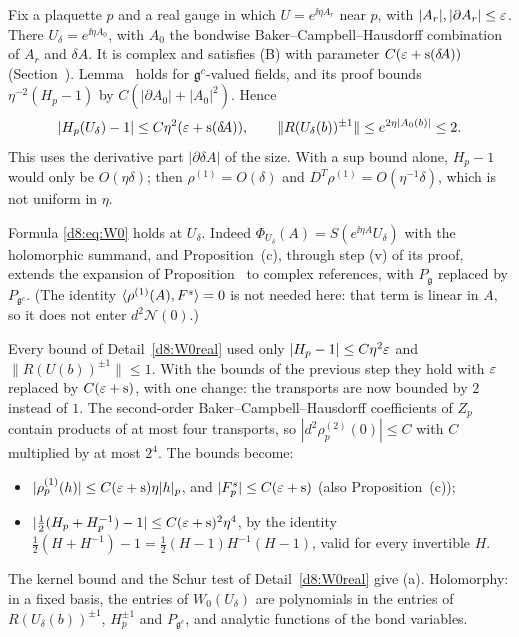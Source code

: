 \begin{detail}
\begin{step}
Fix a plaquette $p$ and a real gauge in which $U=e^{\ii\eta A_r}$ near $p$, with $|A_r|,|\partial A_r|\le\varepsilon$. There $U_\delta=e^{\ii\eta A_0}$, with $A_0$ the bondwise Baker--Campbell--Hausdorff combination of $A_r$ and $\delta\!A$. It is complex and satisfies (B) with parameter $C(\varepsilon+\mathrm s(\delta\!A))$ (Section~). Lemma~ holds for $\mathfrak g^c$-valued fields, and its proof bounds $\eta^{-2}(H_p-1)$ by $C(|\partial A_0|+|A_0|^2)$. Hence
\[
|H_p(U_\delta)-1|\le C\eta^2(\varepsilon+\mathrm s(\delta\!A)),\qquad\|R(U_\delta(b))^{\pm1}\|\le e^{2\eta|A_0(b)|}\le2 .
\]
This uses the derivative part $|\partial\delta\!A|$ of the size. With a sup bound alone, $H_p-1$ would only be $O(\eta\delta)$; then $\rho^{(1)}=O(\delta)$ and $D^T\rho^{(1)}=O(\eta^{-1}\delta)$, which is not uniform in $\eta$.
\end{step}

\begin{step}
Formula \eqref{d8:eq:W0} holds at $U_\delta$. Indeed $\Phi_{U_\delta}(A)=S(e^{\ii\eta A}U_\delta)$ with the holomorphic summand, and Proposition~(c), through step (v) of its proof, extends the expansion of Proposition~ to complex references, with $P_{\mathfrak g}$ replaced by $P_{\mathfrak g^c}$. (The identity $\langle \rho^{(1)}(A),F^s\rangle=0$ is not needed here: that term is linear in $A$, so it does not enter $d^2\mathcal N(0)$.)

Every bound of Detail~\ref{d8:W0real} used only $|H_p-1|\le C\eta^2\varepsilon$ and $\|R(U(b))^{\pm1}\|\le1$. With the bounds of the previous step they hold with $\varepsilon$ replaced by $C(\varepsilon+\mathrm s)$, with one change: the transports are now bounded by $2$ instead of $1$. The second-order Baker--Campbell--Hausdorff coefficients of $Z_p$ contain products of at most four transports, so $|d^2\rho^{(2)}_p(0)|\le C$ with $C$ multiplied by at most $2^4$. The bounds become:
\begin{itemize}
\item $|\rho^{(1)}_p(h)|\le C(\varepsilon+\mathrm s)\eta|h|_p$, and $|F^s_p|\le C(\varepsilon+\mathrm s)$ (also Proposition~(c));
\item $|\frac12(H_p+H_p^{-1})-1|\le C(\varepsilon+\mathrm s)^2\eta^4$, by the identity $\frac12(H+H^{-1})-1=\frac12(H-1)H^{-1}(H-1)$, valid for every invertible $H$.
\end{itemize}
The kernel bound and the Schur test of Detail~\ref{d8:W0real} give (a). Holomorphy: in a fixed basis, the entries of $W_0(U_\delta)$ are polynomials in the entries of $R(U_\delta(b))^{\pm1}$, $H_p^{\pm1}$ and $P_{\mathfrak g^c}$, and analytic functions of the bond variables.
\end{step}


\end{detail}
